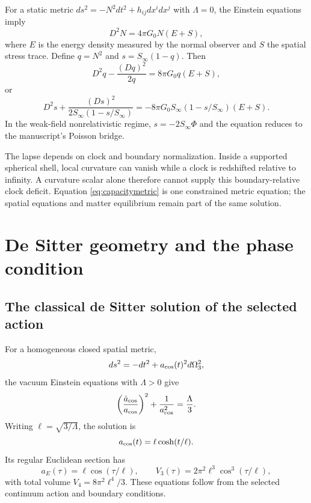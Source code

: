 For a static metric $ds^2=-N^2dt^2+h_{ij}dx^idx^j$ with $\Lambda=0$, the Einstein equations imply
\begin{equation}
D^2N=4\pi G_0N(E+S),
\end{equation}
where $E$ is the energy density measured by the normal observer and $S$ the spatial stress trace. Define $q=N^2$ and $s=S_\infty(1-q)$. Then
\begin{equation}
D^2q-\frac{(Dq)^2}{2q}=8\pi G_0q(E+S),
\end{equation}
or
\begin{equation}
D^2s+\frac{(Ds)^2}{2S_\infty(1-s/S_\infty)}
=-8\pi G_0S_\infty(1-s/S_\infty)(E+S).
\label{eq:capacitymetric}
\end{equation}
In the weak-field nonrelativistic regime, $s=-2S_\infty\Phi$ and the equation reduces to the manuscript's Poisson bridge.

The lapse depends on clock and boundary normalization. Inside a supported spherical shell, local curvature can vanish while a clock is redshifted relative to infinity. A curvature scalar alone therefore cannot supply this boundary-relative clock deficit. Equation \eqref{eq:capacitymetric} is one constrained metric equation; the spatial equations and matter equilibrium remain part of the same solution.

\section{De Sitter geometry and the phase condition}
\label{sec:desitter}

\subsection{The classical de Sitter solution of the selected action}

For a homogeneous closed spatial metric,
\begin{equation}
ds^2=-dt^2+a_{\rm cos}(t)^2d\Omega_3^2,
\end{equation}
the vacuum Einstein equations with $\Lambda>0$ give
\begin{equation}
\left(\frac{\dot a_{\rm cos}}{a_{\rm cos}}\right)^2
+\frac1{a_{\rm cos}^2}=\frac{\Lambda}{3}.
\end{equation}
Writing $\ell=\sqrt{3/\Lambda}$, the solution is
\begin{equation}
a_{\rm cos}(t)=\ell\cosh(t/\ell).
\end{equation}
Its regular Euclidean section has
\begin{equation}
a_E(\tau)=\ell\cos(\tau/\ell),\qquad
V_3(\tau)=2\pi^2\ell^3\cos^3(\tau/\ell),
\label{eq:dsprofile}
\end{equation}
with total volume $V_4=8\pi^2\ell^4/3$. These equations follow from the selected continuum action and boundary conditions.

